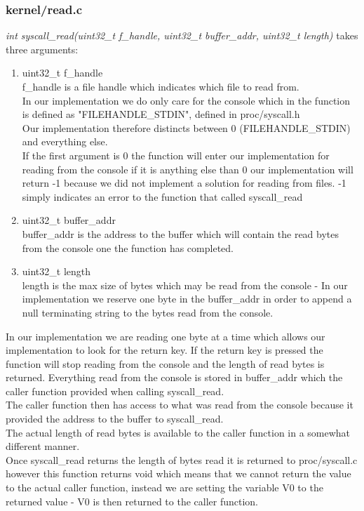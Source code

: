 \documentclass[a4paper,12pt,danish]{report}
\begin{document}
\subsubsection{kernel/read.c}
\textit{int syscall\_read(uint32\_t f\_handle, uint32\_t buffer\_addr, uint32\_t length)} takes three arguments:
\begin{enumerate}
    \item{uint32\_t f\_handle}
        \\
        f\_handle is a file handle which indicates which file to read from.
        \\
        In our implementation we do only care for the console which in the function is defined as "FILEHANDLE\_STDIN", defined in proc/syscall.h\\
        Our implementation therefore distincts between 0 (FILEHANDLE\_STDIN) and everything else.\\
        If the first argument is 0 the function will enter our implementation for reading from the console if it is anything else than 0 our implementation will return -1 because we did not implement a solution for reading from files. -1 simply indicates an error to the function that called syscall\_read
    \item{uint32\_t buffer\_addr}
        \\
        buffer\_addr is the address to the buffer which will contain the read bytes from the console one the function has completed.
    \item{uint32\_t length}
        \\
        length is the max size of bytes which may be read from the console - In our implementation we reserve one byte in the buffer\_addr in order to append a null terminating string to the bytes read from the console.
\end{enumerate}
In our implementation we are reading one byte at a time which allows our implementation to look for the return key. If the return key is pressed the function will stop reading from the console and the length of read bytes is returned. Everything read from the console is stored in buffer\_addr which the caller function provided when calling syscall\_read.\\
The caller function then has access to what was read from the console because it provided the address to the buffer to syscall\_read.
\\
The actual length of read bytes is available to the caller function in a somewhat different manner.
\\
Once syscall\_read returns the length of bytes read it is returned to proc/syscall.c however this function returns void which means that we cannot return the value to the actual caller function, instead we are setting the variable V0 to the returned value - V0 is then returned to the caller function.
\end{document}
